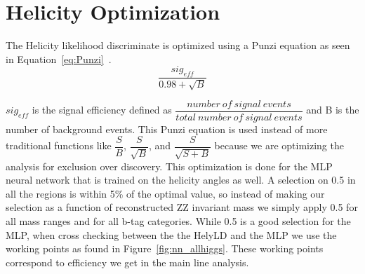 \section{Helicity Optimization}

The Helicity likelihood discriminate is optimized using a Punzi equation as seen in Equation~\ref{eq:Punzi}~\cite{punzi}.
\begin{equation} \dfrac{sig_{eff}}{0.98 + \sqrt{B}} \label{eq:Punzi}\end{equation}

$sig_{eff}$ is the signal efficiency defined as $\dfrac{number\ of\ signal\ events}{total\ number\ of\ signal\ events}$ and B is the number of background events.  This Punzi equation is used instead of more traditional functions like $\dfrac{S}{B}$, $\dfrac{S}{\sqrt{B}}$, and $\dfrac{S}{\sqrt{S+B}}$ because we are optimizing the analysis for exclusion over discovery. This optimization is done for the MLP neural network that is trained on the helicity angles as well. A selection on 0.5 in all the regions is within 5\% of the optimal value, so instead of making our selection as a function of reconstructed ZZ invariant mass we simply apply 0.5 for all mass ranges and for all b-tag categories.  While 0.5 is a good selection for the MLP, when cross checking between the the HelyLD and the MLP we use the working points as found in Figure~\ref{fig:nn_allhiggs}. These working points correspond to efficiency we get in the main line analysis.


